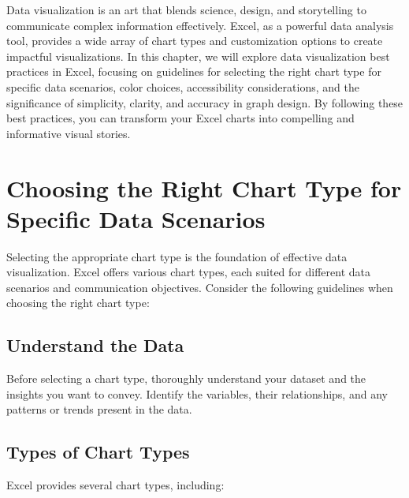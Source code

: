 \documentclass[
]{book}
\begin{document}
Data visualization is an art that blends science, design, and storytelling to communicate complex information effectively. Excel, as a powerful data analysis tool, provides a wide array of chart types and customization options to create impactful visualizations. In this chapter, we will explore data visualization best practices in Excel, focusing on guidelines for selecting the right chart type for specific data scenarios, color choices, accessibility considerations, and the significance of simplicity, clarity, and accuracy in graph design. By following these best practices, you can transform your Excel charts into compelling and informative visual stories.

\hypertarget{choosing-the-right-chart-type-for-specific-data-scenarios}{%
\section{Choosing the Right Chart Type for Specific Data Scenarios}\label{choosing-the-right-chart-type-for-specific-data-scenarios}}

Selecting the appropriate chart type is the foundation of effective data visualization. Excel offers various chart types, each suited for different data scenarios and communication objectives. Consider the following guidelines when choosing the right chart type:

\hypertarget{understand-the-data}{%
\subsection{Understand the Data}\label{understand-the-data}}

Before selecting a chart type, thoroughly understand your dataset and the insights you want to convey. Identify the variables, their relationships, and any patterns or trends present in the data.

\hypertarget{types-of-chart-types}{%
\subsection{Types of Chart Types}\label{types-of-chart-types}}

Excel provides several chart types, including:
\end{document}
